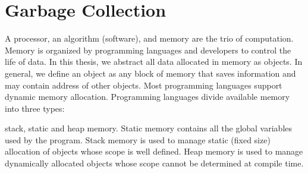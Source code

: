 \begin{comment}
This chapter provides the background information regarding the problem discussed in the thesis. Section
~\ref{intro:gc} describes the fundamental idea behind necessity of garbage collection. Advanced readers can skip the section ~\ref{intro:gc}. Section ~\ref{intro:motv} discusses the advantages of the garbage collection and problem statement of the thesis. Section ~\ref{intro:contr} describes all the contributions of this thesis to solve the problem mentioned in section ~\ref{intro:motv}. Section ~\ref{intro:do} helps the readers to understand how the thesis is organized.
\end{comment}
\section{Garbage Collection}
\label{intro:gc}

A processor, an algorithm (software), and memory are the trio of computation. Memory is organized by programming languages and developers to control the life of data. In this thesis, we abstract all data allocated in memory as objects. In general, we define an object as any block of memory that saves information and may contain address of other objects. Most programming languages support dynamic memory allocation. Programming languages divide available memory into three types: 
\begin {comment}
All programming languages are designed to perform complex computations. Computation contains three main ingredients : Processing unit, algorithm, and memory. Processing unit i.e., the processor is the unit which performs arithmetic, and logical operations required. Algorithm dictates the sequence of operation to performed on the data to get the desired output. Algorithm implemented in a programming language is usually referred as program and collection of programs are called software. Memory saves the input, intermediate results and final output of the computation. 
In this thesis, we are more concerned with object-oriented programming languages and object represents user-defined dynamically allocated data. Developers write algorithms in a specific programming language. Programming language organizes the memory consumed by the algorithm. Modern programming languages use three different memories to organize it.
\end{comment} 
 stack, static and heap memory. Static memory contains all the global variables used by the program. Stack memory is used to manage static (fixed size) allocation of objects whose scope is well defined. Heap memory is used to manage dynamically allocated objects whose scope cannot be determined at compile time. 

